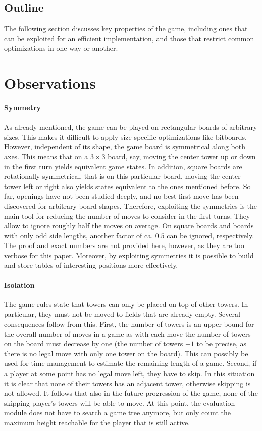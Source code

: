 \documentclass[sigconf]{acmart}
\begin{document}
\subsection{Outline}
The following section discusses key properties of the game, including ones that can be exploited for an efficient implementation, and those that restrict common optimizations in one way or another.

\section{Observations}
\paragraph{Symmetry}
As already mentioned, the game can be played on rectangular boards of arbitrary sizes.
This makes it difficult to apply size-specific optimizations like bitboards.
However, independent of its shape, the game board is symmetrical along both axes.
This means that on a $3\times3$ board, say, moving the center tower up or down in the first turn yields equivalent game states.
In addition, square boards are rotationally symmetrical, that is on this particular board, moving the center tower left or right also yields states equivalent to the ones mentioned before.
So far, openings have not been studied deeply, and no best first move has been discovered for arbitrary board shapes.
Therefore, exploiting the symmetries is the main tool for reducing the number of moves to consider in the first turns.
They allow to ignore roughly half the moves on average.
On square boards and boards with only odd side lengths, another factor of ca. $0.5$ can be ignored, respectively.
The proof and exact numbers are not provided here, however, as they are too verbose for this paper.
Moreover, by exploiting symmetries it is possible to build and store tables of interesting positions more effectively.

\paragraph{Isolation}
The game rules state that towers can only be placed on top of other towers.
In particular, they must not be moved to fields that are already empty.
Several consequences follow from this.
First, the number of towers is an upper bound for the overall number of moves in a game as with each move the number of towers on the board must decrease by one (the number of towers $-1$ to be precise, as there is no legal move with only one tower on the board).
This can possibly be used for time management to estimate the remaining length of a game.
Second, if a player at some point has no legal move left, they have to skip.
In this situation it is clear that none of their towers has an adjacent tower, otherwise skipping is not allowed.
It follows that also in the future progression of the game, none of the skipping player's towers will be able to move.
At this point, the evaluation module does not have to search a game tree anymore, but only count the maximum height reachable for the player that is still active.
\end{document}
